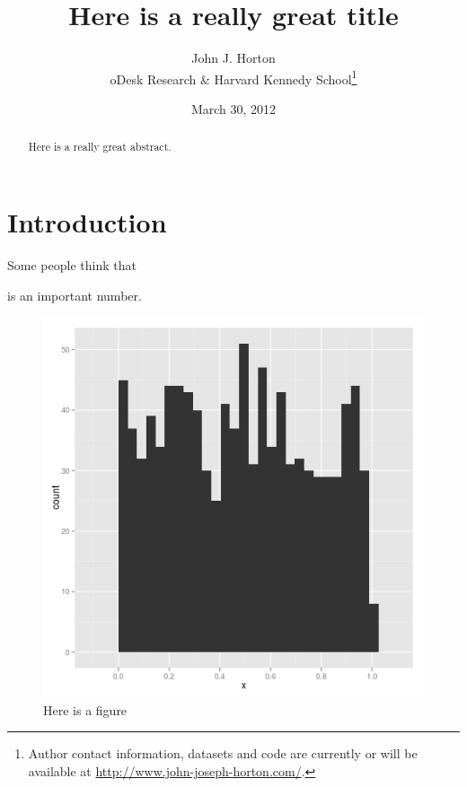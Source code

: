 \documentclass[11pt]{article}
\begin{document}
 

\title{Here is a really great title}
\date{March 30, 2012}

\author{John J. Horton \\ oDesk Research \& Harvard Kennedy
  School\footnote{Author contact information, datasets and code are
    currently or will be available at
    \href{http://www.john-joseph-horton.com/}{http://www.john-joseph-horton.com/}.}}
\maketitle
\begin{abstract}
  Here is a really great abstract.  
\end{abstract} 

\section{Introduction}
Some people think that 

is an important number. 

\begin{figure}[h]
  \centering
  \includegraphics[scale=1]{./plots/hist.png}
  \caption{Here is a figure}
  \label{fig:hist}
\end{figure}



\end{document}
